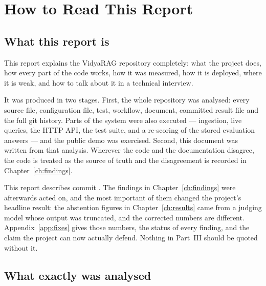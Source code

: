 \chapter*{How to Read This Report}

\section*{What this report is}

This report explains the VidyaRAG repository completely: what the project does, how every part of the code works, how it was measured, how it is deployed, where it is weak, and how to talk about it in a technical interview.

It was produced in two stages. First, the whole repository was analysed: every source file, configuration file, test, workflow, document, committed result file and the full git history. Parts of the system were also executed --- ingestion, live queries, the HTTP API, the test suite, and a re-scoring of the stored evaluation answers --- and the public demo was exercised. Second, this document was written from that analysis. Wherever the code and the documentation disagree, the code is treated as the source of truth and the disagreement is recorded in Chapter~\ref{ch:findings}.

\begin{caution}
This report describes commit . The findings in Chapter~\ref{ch:findings} were afterwards acted on, and the most important of them changed the project's headline result: the abstention figures in Chapter~\ref{ch:results} came from a judging model whose output was truncated, and the corrected numbers are different. Appendix~\ref{app:fixes} gives those numbers, the status of every finding, and the claim the project can now actually defend. Nothing in Part~III should be quoted without it.
\end{caution}

\section*{What exactly was analysed}

